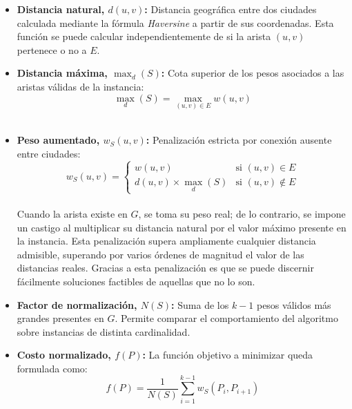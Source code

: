 \documentclass[9pt,a4paper,twocolumn,twoside]{tau-class/tau}
\begin{document}
        \begin{itemize}
            \item \textbf{Distancia natural, $d(u, v)$:} Distancia geográfica entre dos ciudades calculada mediante la fórmula \textit{Haversine} a partir de sus coordenadas. Esta función se puede calcular independientemente de si la arista $(u, v)$ pertenece o no a $E$.\\
            
            \item \textbf{Distancia máxima, $\max_d(S)$:} Cota superior de los pesos asociados a las aristas válidas de la instancia:
            \begin{equation}
                \max_d(S) = \max_{(u, v) \in E} w(u, v)
            \end{equation}\\
            
            \item \textbf{Peso aumentado, $w_S(u, v)$:} Penalización estricta por conexi\'on ausente entre ciudades:\\
            \begin{equation}
                w_S(u, v) = \begin{cases} 
                    w(u, v) & \text{si } (u, v) \in E \\ 
                    d(u, v) \times \max_d(S) & \text{si } (u, v) \notin E 
                \end{cases}
            \end{equation}\\

            Cuando la arista existe en $G$, se toma su peso real; de lo contrario, se impone un castigo al multiplicar su distancia natural por el valor máximo presente en la instancia. Esta penalización supera ampliamente cualquier distancia admisible, superando por varios \'ordenes de magnitud el valor de las distancias reales. Gracias a esta penalizaci\'on es que se puede discernir f\'acilmente soluciones factibles de aquellas que no lo son. \\
            
            
            \item \textbf{Factor de normalización, $N(S)$:} Suma de los $k - 1$ pesos válidos más grandes presentes en $G$. Permite comparar el comportamiento del algoritmo sobre instancias de distinta cardinalidad.\\
            
            \item \textbf{Costo normalizado, $f(P)$:} La función objetivo a minimizar queda formulada como:
            \begin{equation}
                f(P) = \frac{1}{N(S)} \sum_{i=1}^{k-1} w_S(P_i, P_{i+1})
            \end{equation}
        \end{itemize}
\end{document}
